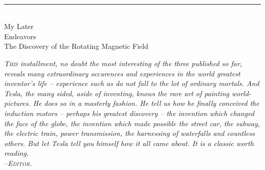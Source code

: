 \documentclass[a4paper,12pt,english,twoside,openright]{memoir}
\begin{document}
\cleardoublepage
\thispagestyle{empty}
\vspace*{5em}
\begin{center}
	\bfseries
	\\
	\noindent\rule{.5\linewidth}{1pt}\\
	\medskip
	{\noindent\LARGE My Later\\Endeavors\\}{\medskip \normalsize \normalfont The Discovery of the Rotating Magnetic Field}
	
	\bigskip
	
	{\normalfont\smallskip\footnotesize\protect\parbox{.75\linewidth}{\itshape
			\lettrine[lines=2]{T}{his} installment, no doubt the most interesting of the three published so far, reveals many extraordinary occurences and experiences in the world greatest inventor's life -- experience such as do not fall to the lot of ordinary mortals. And Tesla, the many sided, aside of inventing, knows the rare art of painting world-pictures. He does so in a masterly fashion. He tell us how he finally conceived the induction motors -- perhaps his greatest discovery -- the invention which changed the face of the globe, the invention which made possible the street car, the subway, the electric train, power transmission, the harnessing of waterfalls and countless others. But let Tesla tell you himself how it all came about. It is a classic worth reading.\\
			
			\hfill --\scshape{Editor}.
			}
		\par
	}
	\vspace*{5em}
\end{center}

\end{document}
